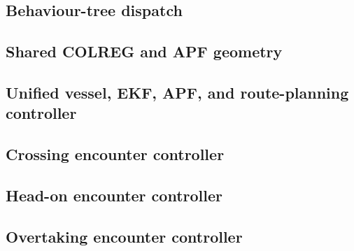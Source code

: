 \documentclass[11pt,a4paper]{article}
\begin{document}
\subsection{Behaviour-tree dispatch}


\subsection{Shared COLREG and APF geometry}


\subsection{Unified vessel, EKF, APF, and route-planning controller}


\subsection{Crossing encounter controller}


\subsection{Head-on encounter controller}


\subsection{Overtaking encounter controller}

\end{document}
